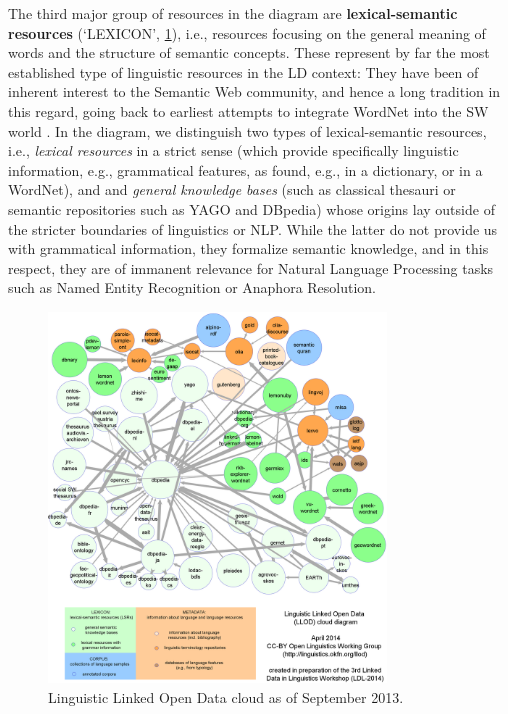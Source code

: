 The third major group of resources in the diagram are \textbf{lexical-semantic resources} (`LEXICON', \ref{figI18nLOD}), i.e., resources focusing on the general meaning of words and the structure of semantic concepts. 
These represent by far the most established type of linguistic resources in the LD context: They have been of inherent interest to the Semantic Web community, and hence a long tradition in this regard, going back to earliest attempts to integrate WordNet into the SW world \citep{gangemi2003ontowordnet}. 
In the diagram, we distinguish two types of lexical-semantic resources, i.e., \emph{lexical resources} in a strict sense (which provide specifically linguistic information, e.g., grammatical features, as found, e.g., in a dictionary, or in a WordNet), and and \emph{general knowledge bases} (such as classical thesauri or semantic repositories such as YAGO and DBpedia) 
whose origins lay outside of the stricter boundaries of linguistics or NLP. 
While the latter do not provide us with grammatical information, they formalize semantic knowledge, and in this respect, they are of immanent relevance for Natural Language Processing tasks such as Named Entity Recognition or Anaphora Resolution. 

\begin{figure}[t]
 \begin{center}
 \includegraphics[width=0.8\textwidth]{llod-colored.png}
 \end{center}
\caption{Linguistic Linked Open Data cloud as of September 2013.}
\label{figI18nLOD}
\end{figure}


